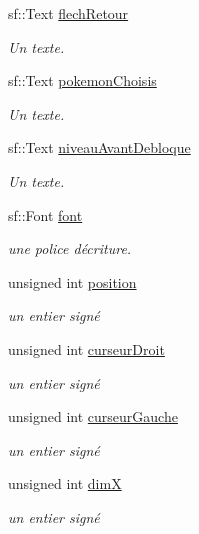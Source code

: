 \begin{DoxyCompactItemize}
sf\+::\+Text \hyperlink{class_s_f_m_l_pokedex_a68eca06ace0197ee2f3c2df95ebc38f7}{flech\+Retour}
\begin{DoxyCompactList}\small\item\em Un texte. \end{DoxyCompactList}\item 
sf\+::\+Text \hyperlink{class_s_f_m_l_pokedex_a8a50323dc304817b241e621de75c98da}{pokemon\+Choisis}
\begin{DoxyCompactList}\small\item\em Un texte. \end{DoxyCompactList}\item 
sf\+::\+Text \hyperlink{class_s_f_m_l_pokedex_a418ba384fed946ddca305937083441e8}{niveau\+Avant\+Debloque}
\begin{DoxyCompactList}\small\item\em Un texte. \end{DoxyCompactList}\item 
sf\+::\+Font \hyperlink{class_s_f_m_l_pokedex_aacfb7ae2339b52abe0b241d7e232e6ae}{font}
\begin{DoxyCompactList}\small\item\em une police d\textquotesingle{}écriture. \end{DoxyCompactList}\item 
unsigned int \hyperlink{class_s_f_m_l_pokedex_a933421afd4da00a1a3e1f5cf812d72af}{position}
\begin{DoxyCompactList}\small\item\em un entier signé \end{DoxyCompactList}\item 
unsigned int \hyperlink{class_s_f_m_l_pokedex_a506ab03c641853b9907b0c24184b8a1a}{curseur\+Droit}
\begin{DoxyCompactList}\small\item\em un entier signé \end{DoxyCompactList}\item 
unsigned int \hyperlink{class_s_f_m_l_pokedex_a23f07085352a8278d016ce1b40508a0b}{curseur\+Gauche}
\begin{DoxyCompactList}\small\item\em un entier signé \end{DoxyCompactList}\item 
unsigned int \hyperlink{class_s_f_m_l_pokedex_ab29c78ecc96b716fa28e59374aba8be4}{dimX}
\begin{DoxyCompactList}\small\item\em un entier signé \end{DoxyCompactList}\item 

\end{DoxyCompactItemize}
